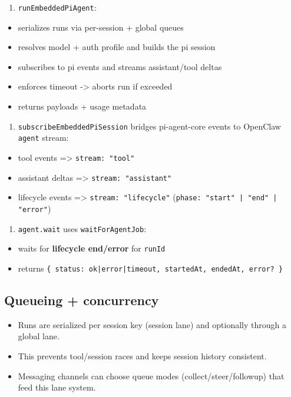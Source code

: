\begin{enumerate}
  \item \texttt{runEmbeddedPiAgent}:
\end{enumerate}

\begin{itemize}
  \item serializes runs via per-session + global queues
  \item resolves model + auth profile and builds the pi session
  \item subscribes to pi events and streams assistant/tool deltas
  \item enforces timeout -> aborts run if exceeded
  \item returns payloads + usage metadata
\end{itemize}

\begin{enumerate}
  \item \texttt{subscribeEmbeddedPiSession} bridges pi-agent-core events to OpenClaw \texttt{agent} stream:
\end{enumerate}

\begin{itemize}
  \item tool events => \texttt{stream: "tool"}
  \item assistant deltas => \texttt{stream: "assistant"}
  \item lifecycle events => \texttt{stream: "lifecycle"} (\texttt{phase: "start" | "end" | "error"})
\end{itemize}

\begin{enumerate}
  \item \texttt{agent.wait} uses \texttt{waitForAgentJob}:
\end{enumerate}

\begin{itemize}
  \item waits for \textbf{lifecycle end/error} for \texttt{runId}
  \item returns \texttt{\{ status: ok|error|timeout, startedAt, endedAt, error? \}}
\end{itemize}


\subsection{Queueing + concurrency}


\begin{itemize}
  \item Runs are serialized per session key (session lane) and optionally through a global lane.
  \item This prevents tool/session races and keeps session history consistent.
  \item Messaging channels can choose queue modes (collect/steer/followup) that feed this lane system.
\end{itemize}

